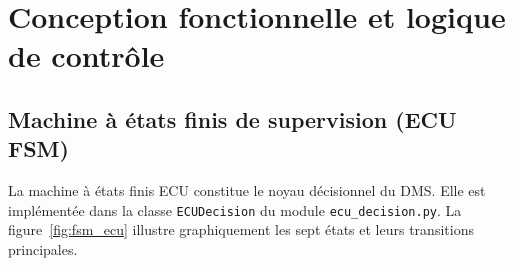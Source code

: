 \documentclass[12pt,a4paper]{report}
\begin{document}
\clearpage


\chapter{Conception fonctionnelle et logique de contr\^ole}

\section{Machine \`a \'etats finis de supervision (ECU FSM)}

La machine \`a \'etats finis ECU constitue le noyau d\'ecisionnel du DMS. Elle est impl\'ement\'ee dans la classe \texttt{ECUDecision} du module \texttt{ecu\_decision.py}. La figure~\ref{fig:fsm_ecu} illustre graphiquement les sept \'etats et leurs transitions principales.
\end{document}
